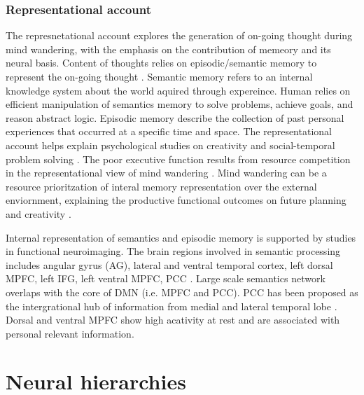 \subsubsection{Representational account}

The represnetational account explores the generation of on-going thought during mind wandering, with the emphasis on the contribution of memeory and its neural basis. Content of thoughts relies on episodic/semantic memory to represent the on-going thought \cite{Binder2009,Gusnard2001}. Semantic memory refers to an internal knowledge system about the world aquired through expereince. Human relies on efficient manipulation of semantics memory to solve problems, achieve goals, and reason abstract logic. Episodic memory describe the collection of past personal experiences that occurred at a specific time and space. The representational account helps explain psychological studies on creativity \cite{Baird2012,Smeekens2016} and social-temporal problem solving \cite{RubyPlos2013,PoerioFrontiers2016,Medea2016}. The poor executive function results from resource competition in the representational view of mind wandering \cite{SmallwoodSchooler2006}. Mind wandering can be a resource prioritzation of interal memory representation over the external enviornment, explaining the productive functional outcomes on future planning \cite{Baird2011} and creativity \cite{Baird2012}. 

Internal representation of semantics and episodic memory is supported by studies in functional neuroimaging. The brain regions involved in semantic processing includes angular gyrus (AG), lateral and ventral temporal cortex, left dorsal MPFC, left IFG, left ventral MPFC, PCC \cite<see meta-analysis from >{Binder2009}. Large scale semantics network overlaps with the core of DMN (i.e. MPFC and PCC). PCC has been proposed as the intergrational hub of information from medial and lateral temporal lobe \cite{Smallwood2016}. Dorsal and ventral MPFC show high acativity at rest and are associated with personal relevant information\cite{Gusnard2001}. 

\cite{Karapanagiotidis2017} %

\cite{Schooler2011}

\cite{Buckner2013}



\section{Neural hierarchies}

